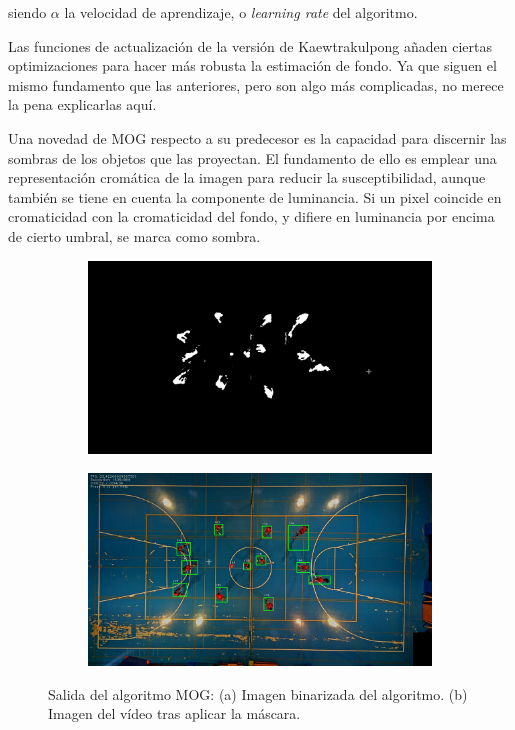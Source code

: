 siendo $\alpha$ la velocidad de aprendizaje, o \textit{learning rate} del algoritmo.

Las funciones de actualización de la versión de Kaewtrakulpong añaden ciertas optimizaciones para hacer más robusta la estimación de fondo. Ya que siguen el mismo fundamento que las anteriores, pero son algo más complicadas, no merece la pena explicarlas aquí.

Una novedad de MOG respecto a su predecesor es la capacidad para discernir las sombras de los objetos que las proyectan. El fundamento de ello es emplear una representación cromática de la imagen para reducir la susceptibilidad, aunque también se tiene en cuenta la componente de luminancia. Si un pixel coincide en cromaticidad con la cromaticidad del fondo, y difiere en luminancia por encima de cierto umbral, se marca como sombra.

\begin{figure}
\begin{subfigure}{.5\textwidth}
  \centering
  \includegraphics[width=.9\linewidth]{images/MOGsub}
  \caption { }
  \label{fig:MOG1a}
\end{subfigure}%
\begin{subfigure}{.5\textwidth}
  \centering
  \includegraphics[width=.9\linewidth]{images/MOG}
  \caption { }
  \label{fig:MOG1b}
\end{subfigure}
\caption{Salida del algoritmo MOG: (a) Imagen binarizada del algoritmo. (b) Imagen del vídeo tras aplicar la máscara.}
\label{fig:MOG}
\end{figure}

